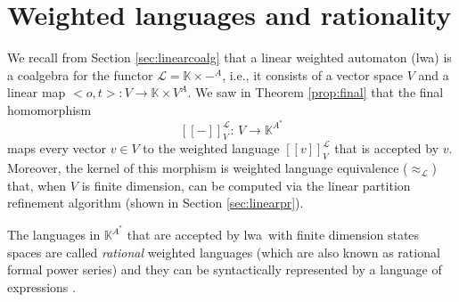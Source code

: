 \documentclass[3p]{elsarticle}
\newcommand{\fL}{\mathcal{L}}    %
\newcommand{\vectproduct}{\times} %
\newcommand{\beh}[3]{\left[\!\left[ #1 \right]\!\right]^{#2}_{#3}} %
\newcommand{\comp}{\circ}               %
\newcommand{\K}{\mathbb{K}}            %
\newcommand{\kernel}{\mathrm{ker}} %
\newcommand{\lwa}{{\sc lwa}}           %
\newtheorem{proposition}{Proposition}
\begin{document}
%
%
%
%
%
%
%


\section{Weighted languages and rationality}\label{sec:rational}
We recall from Section \ref{sec:linearcoalg} that a linear weighted automaton (\lwa)
is a coalgebra for the functor
$\fL = \K \vectproduct -^A$, i.e., it consists of a vector space $V$ and a linear map $<o,t>:V \to \K \vectproduct V^A$.
We saw in Theorem \ref{prop:final} that the final homomorphism
\[
\beh{-}{\fL}{V} : \, V \to \K^{A^*}
\]
maps every vector $v \in V$ to the weighted language
$\beh{v}{\fL}{V}$ that is accepted by $v$.
%
Moreover, the kernel of this morphism is weighted language equivalence ($\approx_{\fL}$) that, when $V$ is finite dimension,
can be computed via the linear partition refinement algorithm (shown in Section \ref{sec:linearpr}).

The languages in $\K^{A^*}$ that are accepted by \lwa\ with finite dimension states spaces are called \emph{rational} weighted languages
(which are also known as rational formal power series) and they can be syntactically represented by a language of expressions \cite{Schutzenberger61b,Rutten2003-behavioural-differential-equations}.
\end{document}
